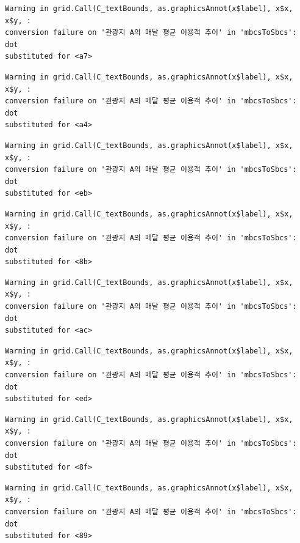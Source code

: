 \documentclass[
  letterpaper,
  DIV=11,
  numbers=noendperiod]{scrreprt}
\begin{document}
\begin{verbatim}
Warning in grid.Call(C_textBounds, as.graphicsAnnot(x$label), x$x, x$y, :
conversion failure on '관광지 A의 매달 평균 이용객 추이' in 'mbcsToSbcs': dot
substituted for <a7>
\end{verbatim}

\begin{verbatim}
Warning in grid.Call(C_textBounds, as.graphicsAnnot(x$label), x$x, x$y, :
conversion failure on '관광지 A의 매달 평균 이용객 추이' in 'mbcsToSbcs': dot
substituted for <a4>
\end{verbatim}

\begin{verbatim}
Warning in grid.Call(C_textBounds, as.graphicsAnnot(x$label), x$x, x$y, :
conversion failure on '관광지 A의 매달 평균 이용객 추이' in 'mbcsToSbcs': dot
substituted for <eb>
\end{verbatim}

\begin{verbatim}
Warning in grid.Call(C_textBounds, as.graphicsAnnot(x$label), x$x, x$y, :
conversion failure on '관광지 A의 매달 평균 이용객 추이' in 'mbcsToSbcs': dot
substituted for <8b>
\end{verbatim}

\begin{verbatim}
Warning in grid.Call(C_textBounds, as.graphicsAnnot(x$label), x$x, x$y, :
conversion failure on '관광지 A의 매달 평균 이용객 추이' in 'mbcsToSbcs': dot
substituted for <ac>
\end{verbatim}

\begin{verbatim}
Warning in grid.Call(C_textBounds, as.graphicsAnnot(x$label), x$x, x$y, :
conversion failure on '관광지 A의 매달 평균 이용객 추이' in 'mbcsToSbcs': dot
substituted for <ed>
\end{verbatim}

\begin{verbatim}
Warning in grid.Call(C_textBounds, as.graphicsAnnot(x$label), x$x, x$y, :
conversion failure on '관광지 A의 매달 평균 이용객 추이' in 'mbcsToSbcs': dot
substituted for <8f>
\end{verbatim}

\begin{verbatim}
Warning in grid.Call(C_textBounds, as.graphicsAnnot(x$label), x$x, x$y, :
conversion failure on '관광지 A의 매달 평균 이용객 추이' in 'mbcsToSbcs': dot
substituted for <89>
\end{verbatim}
\end{document}
